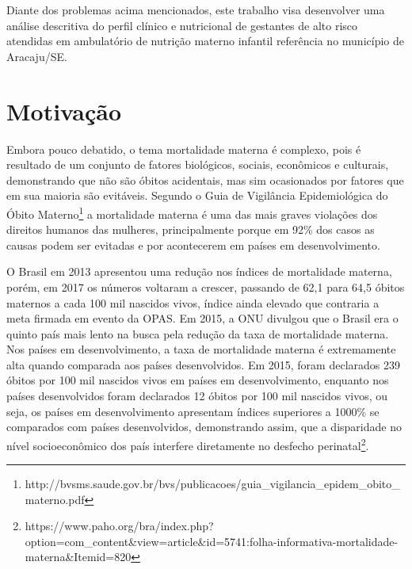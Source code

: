 
Diante dos problemas acima mencionados, este trabalho visa desenvolver uma análise descritiva do perfil clínico e nutricional de gestantes de alto risco atendidas em ambulatório de nutrição materno infantil referência no município de Aracaju/SE. 

\section{Motivação}\label{sec:intro:motivacao}
Embora pouco debatido, o tema mortalidade materna é complexo, pois é resultado de um conjunto de fatores biológicos, sociais, econômicos e culturais, demonstrando que não são óbitos acidentais, mas sim ocasionados por fatores que em sua maioria são evitáveis. Segundo o Guia de Vigilância Epidemiológica do Óbito Materno\footnote{http://bvsms.saude.gov.br/bvs/publicacoes/guia\_vigilancia\_epidem\_obito\_materno.pdf} a mortalidade materna é uma das mais graves violações dos direitos humanos das mulheres, principalmente porque em 92\% dos casos as causas podem ser evitadas e por acontecerem em países em desenvolvimento. 

O Brasil em 2013 apresentou uma redução nos índices de mortalidade materna, porém, em 2017 os números voltaram a crescer, passando de 62,1 para 64,5 óbitos maternos a cada 100 mil nascidos vivos, índice ainda elevado que contraria a meta firmada em evento da \ac{OPAS}. Em 2015, a \ac{ONU} divulgou que o Brasil era o quinto país mais lento na busca pela redução da taxa de mortalidade materna. Nos países em desenvolvimento, a taxa de mortalidade materna é extremamente alta quando comparada aos países desenvolvidos. Em 2015, foram declarados 239 óbitos por 100 mil nascidos vivos em países em desenvolvimento, enquanto nos países desenvolvidos foram declarados 12 óbitos por 100 mil nascidos vivos, ou seja, os países em desenvolvimento apresentam índices superiores a 1000\% se comparados com países desenvolvidos, demonstrando assim, que a disparidade no nível socioeconômico dos país interfere diretamente no desfecho perinatal\footnote{https://www.paho.org/bra/index.php?option=com\_content\&view=article\&id=5741:folha-informativa-mortalidade-materna\&Itemid=820}. %

